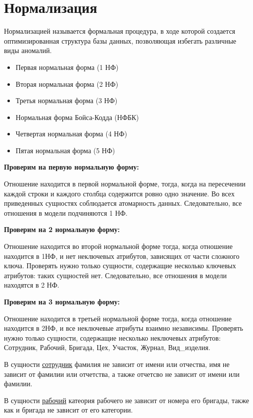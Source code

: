 \section {Нормализация}
Нормализацией называется формальная процедура, в ходе которой создается оптимизированная структура базы данных, позволяющая избегать различные виды аномалий.

\begin{itemize}
    \item Первая нормальная форма (1 НФ)
    \item Вторая нормальная форма (2 НФ)
    \item Третья нормальная форма (3 НФ)
    \item Нормальная форма Бойса-Кодда (НФБК)
    \item Четвертая нормальная форма (4 НФ)
    \item Пятая нормальная форма (5 НФ)
\end{itemize}

{\bf Проверим на первую нормальную форму:}

Отношение находится в первой нормальной форме, тогда, когда на пересечении каждой строки и каждого столбца содержится ровно одно значение.
Во всех приведенных сущностях соблюдается атомарность данных.
Следовательно, все отношения в модели подчиняются 1 НФ.

{\bf Проверим на 2 нормальную форму:}

Отношение находится во второй нормальной форме тогда, когда отношение находится в 1НФ, и нет неключевых атрибутов, зависящих от части сложного ключа.
Проверять нужно только сущности, содержащие несколько ключевых атрибутов: таких сущностей нет.
Следовательно, все отношения в модели находятся в 2 НФ.

{\bf Проверим на 3 нормальную форму:}

Отношение находится в третьей нормальной форме тогда, когда отношение находится в 2НФ, и все неключевые атрибуты взаимно независимы.
Проверять нужно только сущности, содержащие несколько неключевых атрибутов:
Сотрудник, Рабочий, Бригада, Цех, Участок, Журнал, Вид\_изделия.

В сущности \underline{сотрудник} фамилия не зависит от имени или отчества, имя не зависит от фамилии или отчетства, а также отчетсво не зависит от имени или фамилии.

В сущности \underline{рабочий} катеория рабочего не зависит от номера его бригады, также как и бригада не зависит от его категории.

